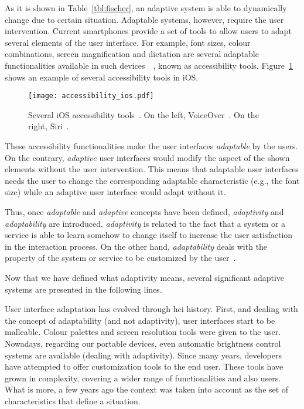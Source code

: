 As it is shown in Table~\ref{tbl:fischer}, an adaptive system is able to 
dynamically change due to certain situation. Adaptable systems, however, require 
the user intervention. Current smartphones provide a set of tools to allow users
to adapt several elements of the user interface. For example, font sizes, colour 
combinations, screen magnification and dictation are several adaptable 
functionalities available in such devices~\citep{android_accessibility}~\citep{ios_accessibility},
known as accessibility tools. Figure~\ref{fig:accessibility_ios} shows an example 
of several accessibility tools in iOS.

\begin{figure}
\centering
\texttt{[image: accessibility\_ios.pdf]}
\caption{Several iOS accessibility tools~\citep{ios_accessibility}. On the left, 
VoiceOver~\citep{ios_voiceover}. On the right, Siri~\citep{ios_siri}.}
\label{fig:accessibility_ios}
\end{figure}

These accessibility functionalities make the user interfaces \textit{adaptable}
by the users. On the contrary, \textit{adaptive} user interfaces would modify 
the aspect of the shown elements without the user intervention. This means that 
adaptable user interfaces needs the user to change the corresponding adaptable 
characteristic (e.g., the font size) while an adaptive user interface would 
adapt without it.

Thus, once \textit{adaptable} and \textit{adaptive} concepts have been defined,
\textit{adaptivity} and \textit{adaptability} are introduced. \textit{adaptivity}
is related to the fact that a system or a service is able to learn somehow to 
change itself to increase the user satisfaction in the interaction process. 
On the other hand, \textit{adaptability} deals with the property of the system
or service to be customized by the user~\citep{jameson_modelling_2001}.

Now that we have defined what adaptivity means, several significant adaptive 
systems are presented in the following lines.

User interface adaptation has evolved through \ac{hci} history. First, and dealing with
the concept of adaptability (and not adaptivity), user interfaces start to be malleable. 
Colour palettes and screen resolution tools were given to the user. Nowadays, regarding
our portable devices, even automatic brightness control systems are available (dealing
with adaptivity). Since many years, developers have attempted to offer customization
tools to the end user. These tools have grown in complexity, covering a wider range of
functionalities and also users. What is more, a few years ago the context was taken
into account as the set of characteristics that define a situation.

